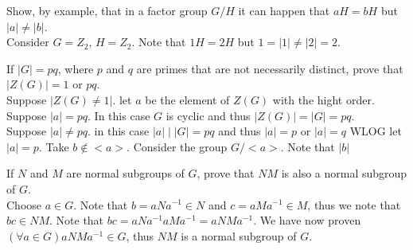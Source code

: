 \documentclass[12pt]{article}
\makeatletter
\theoremstyle{homework}
\newenvironment{exercise}[1]
{\def\@currentlabel{#1}\exercisecore}
{\endexercisecore}
\makeatother
\begin{document}
\begin{exercise}{9.43}
Show, by example, that in a factor group $G/H$ it can happen that $aH = bH$ but $|a| \neq |b|$.\\
Consider $G=Z_2$, $H=Z_2$.  Note that $1H=2H$ but $1=|1|\neq |2|=2$.
\end{exercise}

\begin{exercise}{9.50}
If $|G| = pq$, where $p$ and $q$ are primes that are not necessarily distinct, prove that $|Z(G)| = 1$ or $pq$.\\
Suppose $|Z(G)\neq 1|$.  let $a$ be the element of $Z(G)$ with the hight order.\\
Suppose $|a|=pq$. In this case $G$ is cyclic and thus $|Z(G)|=|G|=pq$.\\
Suppose $|a|\neq pq$.  in this case $|a|\mid |G|=pq$ and thus $|a|=p$ or $|a|=q$ WLOG let $|a|=p$.  Take $b\not \in <a>$.  Consider the group $G/<a>$.  Note that $|b|$
\end{exercise}

\begin{exercise}{9.58}
If $N$ and $M$ are normal subgroups of $G$, prove that $NM$ is also a normal subgroup of $G$.\\
Choose $a\in G$.  Note that $b=aNa^{-1}\in N$ and $c=aMa^{-1}\in M$, thus we note that $bc\in NM$.  Note that $bc=aNa^{-1}aMa^{-1}=aNMa^{-1}$.  We have now proven $(\forall a\in G) aNMa^{-1}\in G$, thus $NM$ is a normal subgroup of $G$.
\end{exercise}
\end{document}

